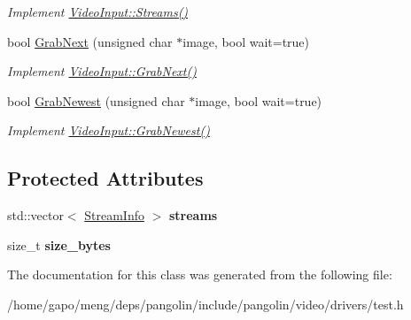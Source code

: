 \begin{DoxyCompactItemize}
\begin{DoxyCompactList}\small\item\em Implement \hyperlink{structpangolin_1_1_video_input_a9030d775d699c39ab7b7ba378c007c6a}{Video\+Input\+::\+Streams()} \end{DoxyCompactList}\item 
bool \hyperlink{classpangolin_1_1_test_video_acc560f46c0a4ed75aa1e99b770eca8d2}{Grab\+Next} (unsigned char $\ast$image, bool wait=true)\hypertarget{classpangolin_1_1_test_video_acc560f46c0a4ed75aa1e99b770eca8d2}{}\label{classpangolin_1_1_test_video_acc560f46c0a4ed75aa1e99b770eca8d2}

\begin{DoxyCompactList}\small\item\em Implement \hyperlink{structpangolin_1_1_video_input_ad3d8ff59c1ec4139320097e6e1111f32}{Video\+Input\+::\+Grab\+Next()} \end{DoxyCompactList}\item 
bool \hyperlink{classpangolin_1_1_test_video_aa85934d2fabe70de53c27bf55443bb4f}{Grab\+Newest} (unsigned char $\ast$image, bool wait=true)\hypertarget{classpangolin_1_1_test_video_aa85934d2fabe70de53c27bf55443bb4f}{}\label{classpangolin_1_1_test_video_aa85934d2fabe70de53c27bf55443bb4f}

\begin{DoxyCompactList}\small\item\em Implement \hyperlink{structpangolin_1_1_video_input_a4c8ac38e3c6a3f591663aeebf645e4c6}{Video\+Input\+::\+Grab\+Newest()} \end{DoxyCompactList}\end{DoxyCompactItemize}
\subsection*{Protected Attributes}
\begin{DoxyCompactItemize}
\item 
std\+::vector$<$ \hyperlink{classpangolin_1_1_stream_info}{Stream\+Info} $>$ {\bfseries streams}\hypertarget{classpangolin_1_1_test_video_abde8d7a1dbdcc210d7bd3925c3ed3e38}{}\label{classpangolin_1_1_test_video_abde8d7a1dbdcc210d7bd3925c3ed3e38}

\item 
size\+\_\+t {\bfseries size\+\_\+bytes}\hypertarget{classpangolin_1_1_test_video_a66692e2656abd48a7acea11a893453a6}{}\label{classpangolin_1_1_test_video_a66692e2656abd48a7acea11a893453a6}

\end{DoxyCompactItemize}


The documentation for this class was generated from the following file\+:\begin{DoxyCompactItemize}
\item 
/home/gapo/meng/deps/pangolin/include/pangolin/video/drivers/test.\+h\end{DoxyCompactItemize}
